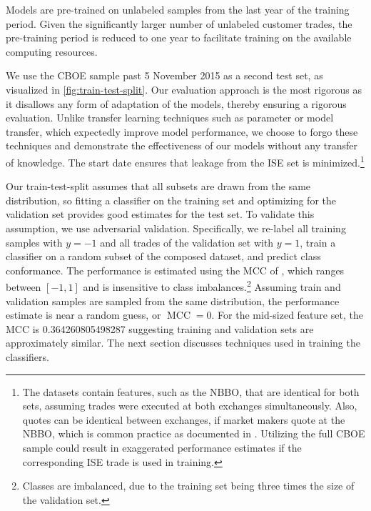 Models are pre-trained on unlabeled samples from the last year of the training period. Given the significantly larger number of unlabeled customer trades, the pre-training period is reduced to one year to facilitate training on the available computing resources.

We use the \gls{CBOE} sample past 5 November 2015 as a second test set, as visualized in \cref{fig:train-test-split}. Our evaluation approach is the most rigorous as it disallows any form of adaptation of the models, thereby ensuring a rigorous evaluation. Unlike transfer learning techniques such as parameter or model transfer, which expectedly improve model performance, we choose to forgo these techniques and demonstrate the effectiveness of our models without any transfer of knowledge. The start date ensures that leakage from the \gls{ISE} set is minimized.\footnote{The datasets contain features, such as the \gls{NBBO}, that are identical for both sets, assuming trades were executed at both exchanges simultaneously. Also, quotes can be identical between exchanges, if market makers quote at the \gls{NBBO}, which is common practice as documented in \textcite[\checkmark][10]{securitiesandexchangecommissionReportConcerningExaminations2007}. Utilizing the full \gls{CBOE} sample could result in exaggerated performance estimates if the corresponding \gls{ISE} trade is used in training.}

Our train-test-split assumes that all subsets are drawn from the same distribution, so fitting a classifier on the training set and optimizing for the validation set provides good estimates for the test set. To validate this assumption, we use adversarial validation. Specifically, we re-label all training samples with $y=-1$ and all trades of the validation set with $y=1$, train a classifier on a random subset of the composed dataset, and predict class conformance. The performance is estimated using the \gls{MCC} of \textcite[\checkmark][445]{matthewsComparisonPredictedObserved1975}, which ranges between $\left[-1, 1\right]$ and is insensitive to class imbalances.\footnote{Classes are imbalanced, due to the training set being three times the size of the validation set.} Assuming train and validation samples are sampled from the same distribution, the performance estimate is near a random guess, or $\operatorname{MCC} = 0$. For the mid-sized feature set, the \gls{MCC} is \num{0.364260805498287} suggesting training and validation sets are approximately similar. The next section discusses techniques used in training the classifiers.